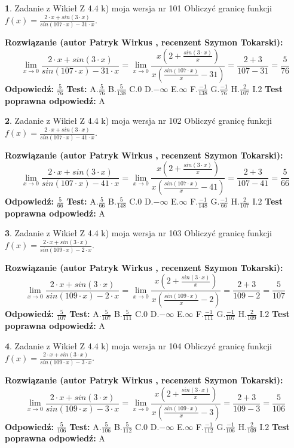 \documentclass[12pt, a4paper]{article}
\theoremstyle{definition} %
\newtheorem{zad}{}
\newcommand{\zadStart}[1]{\begin{zad}#1\newline}
\newcommand{\zadStop}{\end{zad}}
\newcommand{\rozwStart}[2]{\noindent \textbf{Rozwiązanie (autor #1 , recenzent #2): }\newline}
\newcommand{\rozwStop}{\newline}
\newcommand{\odpStart}{\noindent \textbf{Odpowiedź:}\newline}
\newcommand{\odpStop}{\newline}
\newcommand{\testStart}{\noindent \textbf{Test:}\newline}
\newcommand{\testStop}{\newline}
\newcommand{\kluczStart}{\noindent \textbf{Test poprawna odpowiedź:}\newline}
\newcommand{\kluczStop}{\newline}
\begin{document}
\zadStart{Zadanie z Wikieł Z 4.4 k) moja wersja nr 101}
Obliczyć granicę funkcji $f(x)=\frac{2\cdot x +sin(3\cdot x)}{sin(107\cdot x) -31\cdot x}$.
\zadStop
\rozwStart{Patryk Wirkus}{Szymon Tokarski}
$$\lim\limits_{x\to 0}\frac{2\cdot x +sin(3\cdot x)}{sin(107\cdot x) -31\cdot x}
=\lim\limits_{x\to 0}\frac{x(2+\frac{sin(3\cdot x)}{x})}{x(\frac{sin(107\cdot x)}{x}-31)}
=\frac{2+3}{107-31} = \frac{5}{76}$$
\rozwStop
\odpStart
$\frac{5}{76}$
\odpStop
\testStart
A.$\frac{5}{76}$
B.$\frac{5}{138}$
C.$0$
D.$-\infty$
E.$\infty$
F.$\frac{-1}{138}$
G.$\frac{-1}{76}$
H.$\frac{2}{107}$
I.$2$
\testStop
\kluczStart
A
\kluczStop



\zadStart{Zadanie z Wikieł Z 4.4 k) moja wersja nr 102}
Obliczyć granicę funkcji $f(x)=\frac{2\cdot x +sin(3\cdot x)}{sin(107\cdot x) -41\cdot x}$.
\zadStop
\rozwStart{Patryk Wirkus}{Szymon Tokarski}
$$\lim\limits_{x\to 0}\frac{2\cdot x +sin(3\cdot x)}{sin(107\cdot x) -41\cdot x}
=\lim\limits_{x\to 0}\frac{x(2+\frac{sin(3\cdot x)}{x})}{x(\frac{sin(107\cdot x)}{x}-41)}
=\frac{2+3}{107-41} = \frac{5}{66}$$
\rozwStop
\odpStart
$\frac{5}{66}$
\odpStop
\testStart
A.$\frac{5}{66}$
B.$\frac{5}{148}$
C.$0$
D.$-\infty$
E.$\infty$
F.$\frac{-1}{148}$
G.$\frac{-1}{66}$
H.$\frac{2}{107}$
I.$2$
\testStop
\kluczStart
A
\kluczStop



\zadStart{Zadanie z Wikieł Z 4.4 k) moja wersja nr 103}
Obliczyć granicę funkcji $f(x)=\frac{2\cdot x +sin(3\cdot x)}{sin(109\cdot x) -2\cdot x}$.
\zadStop
\rozwStart{Patryk Wirkus}{Szymon Tokarski}
$$\lim\limits_{x\to 0}\frac{2\cdot x +sin(3\cdot x)}{sin(109\cdot x) -2\cdot x}
=\lim\limits_{x\to 0}\frac{x(2+\frac{sin(3\cdot x)}{x})}{x(\frac{sin(109\cdot x)}{x}-2)}
=\frac{2+3}{109-2} = \frac{5}{107}$$
\rozwStop
\odpStart
$\frac{5}{107}$
\odpStop
\testStart
A.$\frac{5}{107}$
B.$\frac{5}{111}$
C.$0$
D.$-\infty$
E.$\infty$
F.$\frac{-1}{111}$
G.$\frac{-1}{107}$
H.$\frac{2}{109}$
I.$2$
\testStop
\kluczStart
A
\kluczStop



\zadStart{Zadanie z Wikieł Z 4.4 k) moja wersja nr 104}
Obliczyć granicę funkcji $f(x)=\frac{2\cdot x +sin(3\cdot x)}{sin(109\cdot x) -3\cdot x}$.
\zadStop
\rozwStart{Patryk Wirkus}{Szymon Tokarski}
$$\lim\limits_{x\to 0}\frac{2\cdot x +sin(3\cdot x)}{sin(109\cdot x) -3\cdot x}
=\lim\limits_{x\to 0}\frac{x(2+\frac{sin(3\cdot x)}{x})}{x(\frac{sin(109\cdot x)}{x}-3)}
=\frac{2+3}{109-3} = \frac{5}{106}$$
\rozwStop
\odpStart
$\frac{5}{106}$
\odpStop
\testStart
A.$\frac{5}{106}$
B.$\frac{5}{112}$
C.$0$
D.$-\infty$
E.$\infty$
F.$\frac{-1}{112}$
G.$\frac{-1}{106}$
H.$\frac{2}{109}$
I.$2$
\testStop
\kluczStart
A
\kluczStop
\end{document}
